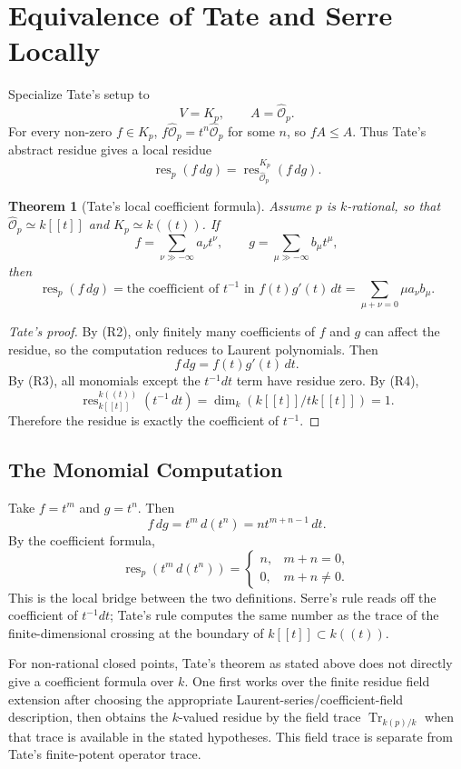 \documentclass[11pt,a4paper]{article}
\newcommand{\wideO}{\widehat{\mathcal O}}
\newcommand{\res}{\operatorname{res}}
\newcommand{\Tr}{\operatorname{Tr}}
\theoremstyle{definition}
\theoremstyle{plain}
\newtheorem{theorem}[definition]{Theorem}
\theoremstyle{remark}
\begin{document}
\section{Equivalence of Tate and Serre Locally}

Specialize Tate's setup to
\[
  V=K_p,
  \qquad
  A=\wideO_p.
\]
For every non-zero $f\in K_p$, $f\wideO_p=t^n\wideO_p$ for some $n$, so $fA\le A$.  Thus Tate's abstract residue gives a local residue
\[
  \res_p(f\,dg)=\res^{K_p}_{\wideO_p}(f\,dg).
\]

\begin{theorem}[Tate's local coefficient formula]
Assume $p$ is $k$-rational, so that $\wideO_p\simeq k[[t]]$ and $K_p\simeq k((t))$.  If
\[
  f=\sum_{\nu\gg -\infty}a_\nu t^\nu,
  \qquad
  g=\sum_{\mu\gg -\infty}b_\mu t^\mu,
\]
then
\[
  \res_p(f\,dg)
  =\text{the coefficient of }t^{-1}\text{ in }f(t)g'(t)\,dt
  =\sum_{\mu+\nu=0}\mu a_\nu b_\mu.
\]
\end{theorem}

\begin{proof}[Tate's proof]
By (R2), only finitely many coefficients of $f$ and $g$ can affect the residue, so the computation reduces to Laurent polynomials.  Then
\[
  f\,dg=f(t)g'(t)\,dt.
\]
By (R3), all monomials except the $t^{-1}dt$ term have residue zero.  By (R4),
\[
  \res_{k[[t]]}^{k((t))}(t^{-1}\,dt)=\dim_k(k[[t]]/t k[[t]])=1.
\]
Therefore the residue is exactly the coefficient of $t^{-1}$.
\end{proof}

\subsection{The Monomial Computation}

Take $f=t^m$ and $g=t^n$.  Then
\[
  f\,dg=t^m\,d(t^n)=n t^{m+n-1}\,dt.
\]
By the coefficient formula,
\[
  \res_p(t^m\,d(t^n))=
  \begin{cases}
    n, & m+n=0,\\
    0, & m+n\ne 0.
  \end{cases}
\]
This is the local bridge between the two definitions.  Serre's rule reads off the coefficient of $t^{-1}dt$; Tate's rule computes the same number as the trace of the finite-dimensional crossing at the boundary of $k[[t]]\subset k((t))$.

For non-rational closed points, Tate's theorem as stated above does not directly give a coefficient formula over $k$.  One first works over the finite residue field extension after choosing the appropriate Laurent-series/coefficient-field description, then obtains the $k$-valued residue by the field trace $\Tr_{k(p)/k}$ when that trace is available in the stated hypotheses.  This field trace is separate from Tate's finite-potent operator trace.
\end{document}
